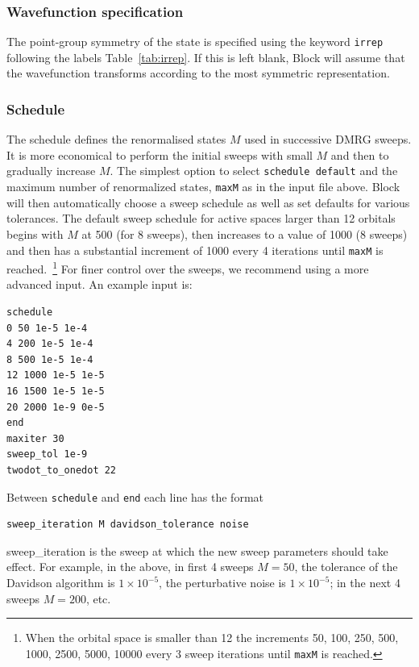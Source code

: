 \documentclass[letterpaper,12pt,aps, pra]{revtex4-1}
\begin{document}
\subsubsection{Wavefunction specification}

The point-group symmetry of the state is specified using the keyword \texttt{irrep} following the labels Table~\ref{tab:irrep}.
If this is left blank, Block will assume that the wavefunction transforms according to the most symmetric representation.

\subsubsection{Schedule}

The schedule defines the renormalised states $M$ used in successive DMRG
sweeps. It is more economical to perform the initial sweeps with small $M$ and
then to gradually increase $M$. The simplest option to select \texttt{schedule
default} and the maximum number of renormalized states, \texttt{maxM} as in the
input file above. Block will then automatically choose a sweep schedule as well
as set defaults for various tolerances.  The default sweep schedule for active
spaces larger than 12 orbitals begins with $M$ at 500 (for 8 sweeps), then increases
to a value of 1000 (8 sweeps) and then has a substantial increment of 1000
every 4 iterations until \texttt{maxM} is reached.~\footnote{ When the orbital
space is smaller than 12 the increments 50, 100, 250, 500, 1000, 2500, 5000,
10000 every 3 sweep iterations until \texttt{maxM} is reached.} For finer
control over the sweeps, we recommend using a more advanced input. An example
input is:

\begin{verbatim}
schedule 
0 50 1e-5 1e-4
4 200 1e-5 1e-4
8 500 1e-5 1e-4
12 1000 1e-5 1e-5
16 1500 1e-5 1e-5
20 2000 1e-9 0e-5
end
maxiter 30
sweep_tol 1e-9
twodot_to_onedot 22
\end{verbatim}

Between \texttt{schedule} and \texttt{end} each line
has the format
\begin{verbatim}
sweep_iteration M davidson_tolerance noise
\end{verbatim}

sweep\_iteration is the sweep at which the new sweep parameters should take
effect. For example, in the above, in  first 4 sweeps $M=50$, the tolerance of
the Davidson algorithm is $1\times 10^{-5}$, the perturbative  noise is $1
\times 10^{-5}$; in the next 4 sweeps $M=200$, etc.
\end{document}
